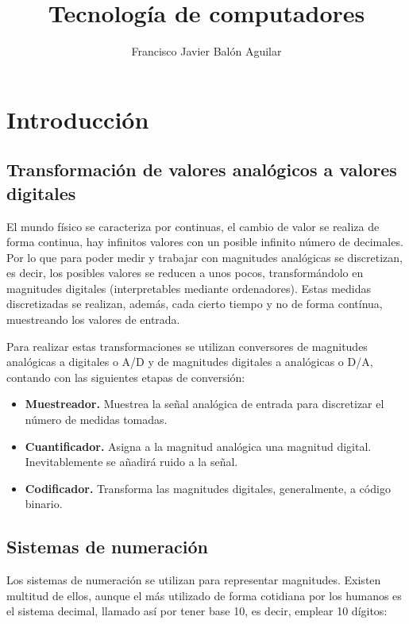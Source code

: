 \documentclass[a4paper, 11pt, titlepage]{article}
\title{Tecnología de computadores}
\author{Francisco Javier Balón Aguilar}
\begin{document}
\maketitle
\renewcommand{\contentsname}{Índice}
\tableofcontents
\newpage

\section{Introducción}

    \subsection{Transformación de valores analógicos a valores digitales}

        El mundo físico se caracteriza por continuas, el cambio de valor se realiza de forma continua, hay infinitos 
        valores con un posible infinito número de decimales. Por lo que para poder medir y trabajar con magnitudes 
        analógicas se discretizan, es decir, los posibles valores se reducen a unos pocos, transformándolo en magnitudes 
        digitales (interpretables mediante ordenadores). Estas medidas discretizadas se realizan, además, cada cierto 
        tiempo y no de forma contínua, muestreando los valores de entrada.

        Para realizar estas transformaciones se utilizan conversores de magnitudes analógicas a digitales o A/D y de 
        magnitudes digitales a analógicas o D/A, contando con las siguientes etapas de conversión:

        \begin{itemize}
            \item \textbf{Muestreador.} Muestrea la señal analógica de entrada para discretizar el número de medidas 
            tomadas.
            \item \textbf{Cuantificador.} Asigna a la magnitud analógica una magnitud digital. Inevitablemente se 
            añadirá ruido a la señal.
            \item \textbf{Codificador.} Transforma las magnitudes digitales, generalmente, a código binario.
        \end{itemize}

    \subsection{Sistemas de numeración}

        Los sistemas de numeración se utilizan para representar magnitudes. Existen multitud de ellos, aunque el más 
        utilizado de forma cotidiana por los humanos es el sistema decimal, llamado así por tener base 10, es decir, 
        emplear 10 dígitos:
\end{document}
